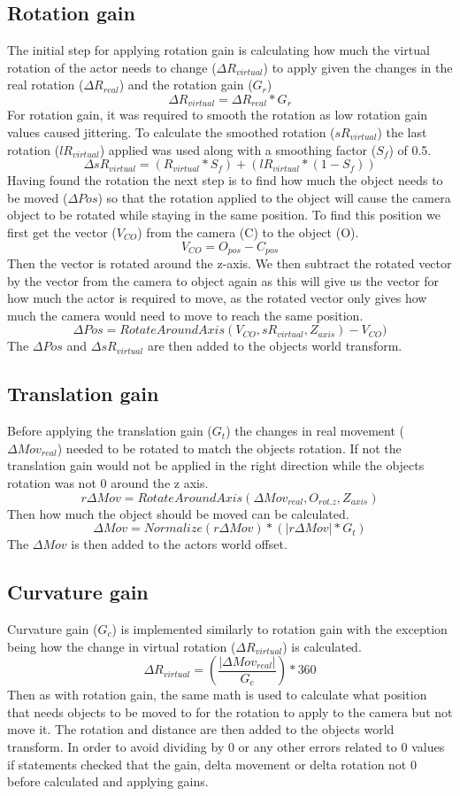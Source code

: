 \subsection{Rotation gain}
The initial step for applying rotation gain is calculating how much the virtual rotation of the actor needs to change ($\Delta R_{virtual}$) to apply given the changes in the real rotation ($\Delta R_{real}$) and the rotation gain ($G_{r}$)
\[\Delta R_{virtual} = \Delta R_{real} * G_{r}\]
For rotation gain, it was required to smooth the rotation as low rotation gain values caused jittering. To calculate the smoothed rotation ($sR_{virtual}$) the last rotation ($lR_{virtual}$) applied was used along with a smoothing factor ($S_f$) of 0.5.
\[\Delta sR_{virtual} = (R_{virtual} * S_f) + (lR_{virtual} * (1 - S_f)) \]
Having found the rotation the next step is to find how much the object needs to be moved ($\Delta Pos $) so that the rotation applied to the object will cause the camera object to be rotated while staying in the same position. To find this position we first get the vector ($V_{CO}$) from the camera (C) to the object (O).
\[V_{CO} = O_{pos} - C_{pos} \]
Then the vector is rotated around the z-axis. We then subtract the rotated vector by the vector from the camera to object again as this will give us the vector for how much the actor is required to move, as the rotated vector only gives how much the camera would need to move to reach the same position.
\[\Delta Pos = RotateAroundAxis( V_{CO}, sR_{virtual}, Z_{axis}) -  V_{CO})\]
The $\Delta Pos$ and $\Delta sR_{virtual}$ are then added to the objects world transform. 

\subsection{Translation gain}
Before applying the translation gain ($G_{t}$) the changes in real movement ($\Delta Mov_{real}$) needed to be rotated to match the objects rotation. If not the translation gain would not be applied in the right direction while the objects rotation was not 0 around the z axis.
\[r\Delta Mov = RotateAroundAxis(\Delta Mov_{real}, O_{rot.z}, Z_{axis}) \]
Then how much the object should be moved can be calculated.
\[\Delta Mov = Normalize(r\Delta Mov) * ( |r\Delta Mov| * G_{t})\]
The $\Delta Mov$ is then added to the actors world offset.

\subsection{Curvature gain}
Curvature gain ($G_{c}$) is implemented similarly to rotation gain with the exception being how the change in virtual rotation ($\Delta R_{virtual}$) is calculated.
\[\Delta R_{virtual} = (\frac{|\Delta Mov_{real}|}{G_{c}}) * 360\]
Then as with rotation gain, the same math is used to calculate what position that needs objects to be moved to for the rotation to apply to the camera but not move it. The rotation and distance are then added to the objects world transform. In order to avoid dividing by 0 or any other errors related to 0 values if statements checked that the gain, delta movement or delta rotation not 0 before calculated and applying gains.